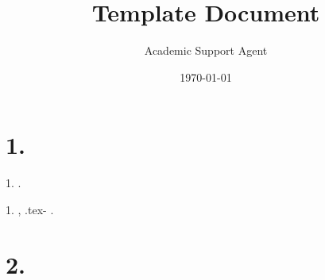 \documentclass{article}
\title{Template Document}
\author{Academic Support Agent}
\date{\today}
\begin{document}
\maketitle

\maketitle %


\section*{  1.}

      1.        .

            1.
           ,       .tex-         .

\section*{  2.}
\end{document}
